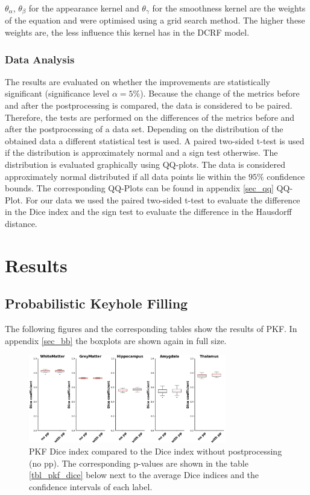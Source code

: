 \documentclass[journal]{IEEEtran}
\begin{document}
$\theta_\alpha$, $\theta_\beta$ for the appearance kernel and $\theta_\gamma$ for the smoothness kernel are the weights of the equation and were optimised using a grid search method. The higher these weights are, the less influence this kernel has in the DCRF model.
\subsubsection{Data Analysis}
The results are evaluated on whether the improvements are statistically significant (significance level $\alpha = 5\%$). Because the change of the metrics before and after the postprocessing is compared, the data is considered to be paired. Therefore, the tests are performed on the differences of the metrics before and after the postprocessing of a data set. Depending on the distribution of the obtained data a different statistical test is used. A paired two-sided t-test is used if the distribution is approximately normal and a sign test otherwise. The distribution is evaluated graphically using QQ-plots. The data is considered approximately normal distributed if all data points lie within the $95\%$ confidence bounds. The corresponding QQ-Plots can be found in appendix \ref{sec_qq} QQ-Plot. For our data we used the paired two-sided t-test to evaluate the difference in the Dice index and the sign test to evaluate the difference in the Hausdorff distance. 
\section{Results}

\newcommand{\expnumber}[2]{{#1}\mathrm{e}{#2}}
\subsection{Probabilistic Keyhole Filling}
The following figures and the corresponding tables show the results of PKF. In appendix \ref{sec_bb} the boxplots are shown again in full size.

\begin{figure}[ht]
\centering

\includegraphics[width=3.4in]{img/boxplots/PKF-Dice.png}

\caption{PKF Dice index compared to the Dice index without postprocessing (no pp). The corresponding p-values are shown in the table \ref{tbl_pkf_dice} below next to the average Dice indices and the confidence intervals of each label.}
\label{fig_pkf_dice}
\end{figure}
\end{document}
